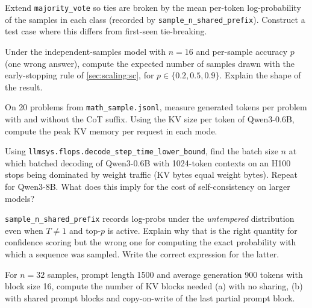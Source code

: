 \begin{exercise}
Extend \texttt{majority\_vote} so ties are broken by the mean per-token log-probability of the
samples in each class (recorded by \texttt{sample\_n\_shared\_prefix}). Construct a test case where
this differs from first-seen tie-breaking.
\end{exercise}

\begin{exercise}
Under the independent-samples model with $n=16$ and per-sample accuracy $p$ (one wrong answer),
compute the expected number of samples drawn with the early-stopping rule of
\cref{sec:scaling:sc}, for $p \in \{0.2, 0.5, 0.9\}$. Explain the shape of the result.
\end{exercise}

\begin{exercise}
On 20 problems from \texttt{math\_sample.jsonl}, measure generated tokens per problem with and
without the CoT suffix. Using the KV size per token of Qwen3-0.6B, compute the peak KV memory per
request in each mode.
\end{exercise}

\begin{exercise}
Using \texttt{llmsys.flops.decode\_step\_time\_lower\_bound}, find the batch size $n$ at which
batched decoding of Qwen3-0.6B with 1024-token contexts on an H100 stops being dominated by weight
traffic (KV bytes equal weight bytes). Repeat for Qwen3-8B. What does this imply for the cost of
self-consistency on larger models?
\end{exercise}

\begin{exercise}
\texttt{sample\_n\_shared\_prefix} records log-probs under the \emph{untempered} distribution even
when $T \neq 1$ and top-$p$ is active. Explain why that is the right quantity for confidence
scoring but the wrong one for computing the exact probability with which a sequence was sampled.
Write the correct expression for the latter.
\end{exercise}

\begin{exercise}
For $n = 32$ samples, prompt length 1500 and average generation 900 tokens with block size 16,
compute the number of KV blocks needed (a) with no sharing, (b) with shared prompt blocks and
copy-on-write of the last partial prompt block.
\end{exercise}

